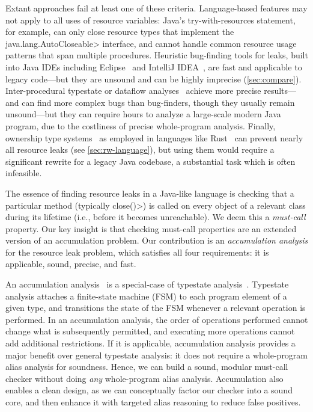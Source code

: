 Extant approaches fail at least one of these criteria.
Language-based features may not apply to all uses of resource variables:
Java's try-with-resources statement, for example, can
only close resource types that implement the \<java.lang.AutoCloseable> interface,
and cannot handle
common resource usage patterns that span multiple procedures. 
Heuristic bug-finding tools for leaks, built into Java IDEs including
Eclipse~\cite{ecj-resource-leak} and IntelliJ
IDEA~\cite{idea-resource-leak}, 
are fast and applicable to legacy
code---but they are unsound and can be highly imprecise
(\cref{sec:compare}).
Inter-procedural typestate or dataflow analyses~\cite{TorlakC10,zuo2019grapple}
achieve more precise
results---and
can find more complex bugs than bug-finders, though they usually remain
unsound---but
they can require hours to analyze a large-scale modern Java program, due
to the costliness of precise whole-program analysis.
Finally, ownership type
systems~\cite{clarke2013ownership} as employed in languages like
Rust~\cite{klabnik2018rust} can prevent nearly all resource leaks (see
\cref{sec:rw-language}), but using them would require a significant rewrite for
a legacy Java codebase, a substantial task which is often infeasible.

The essence of finding resource leaks in a Java-like language is
checking that a particular method (typically \<close()>) is called on
every object of a relevant class during its lifetime (i.e., before it
becomes unreachable).  We deem this a \emph{must-call} property.  Our
key insight is that checking must-call properties are an extended version of an
accumulation problem.
Our contribution is an \emph{accumulation analysis} for the resource leak
problem, which satisfies all four requirements:  it is applicable,
sound, precise, and fast.

An accumulation analysis~\cite{KelloggRSSE2020}
is a special-case of typestate analysis~\cite{StromY86}.
Typestate analysis attaches a finite-state machine (FSM)
to each program element of a given type, and transitions the state of the
FSM whenever a relevant operation is performed.
In an accumulation analysis,
the order of operations performed cannot change what is subsequently
permitted, and executing more operations cannot add additional
restrictions.  If it is applicable, accumulation analysis provides a major
benefit over general typestate analysis: it does not
require a whole-program alias analysis for soundness.
Hence, we can build a sound, modular must-call
checker without doing \emph{any} whole-program alias analysis.
Accumulation also enables a clean design, as we
can conceptually factor our checker into a sound core, and
then enhance it with
targeted alias reasoning to reduce false positives.

